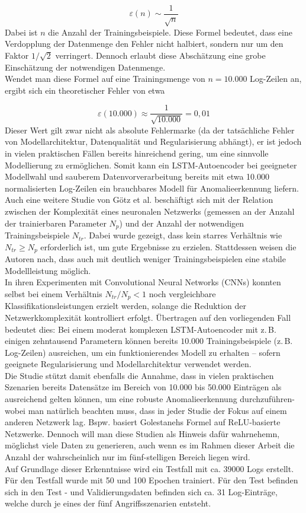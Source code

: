\documentclass[a4paper,12pt]{article}
\begin{document}
	\[
	\varepsilon(n) \sim \frac{1}{\sqrt{n}}
	\]
	Dabei ist \(n\) die Anzahl der Trainingsbeispiele. Diese Formel bedeutet, dass eine Verdopplung der Datenmenge den Fehler nicht halbiert, sondern nur um den Faktor \(1/\sqrt{2}\) verringert. Dennoch erlaubt diese Abschätzung eine grobe Einschätzung der notwendigen Datenmenge.
	\\[0.5em]
	Wendet man diese Formel auf eine Trainingsmenge von $n = 10.000$ Log-Zeilen an, ergibt sich ein theoretischer Fehler von etwa
	
	\[
	\varepsilon(10.000) \approx \frac{1}{\sqrt{10.000}} = 0{,}01
	\]
	Dieser Wert gilt zwar nicht als absolute Fehlermarke (da der tatsächliche Fehler von Modellarchitektur, Datenqualität und Regularisierung abhängt), er ist jedoch in vielen praktischen Fällen bereits hinreichend gering, um eine sinnvolle Modellierung zu ermöglichen. Somit kann ein LSTM-Autoencoder bei geeigneter Modellwahl und sauberem Datenvorverarbeitung bereits mit etwa 10.000 normalisierten Log-Zeilen ein brauchbares Modell für Anomalieerkennung liefern.
	\\[0.5em]
	Auch eine weitere Studie von Götz et al. \cite{Goetz2023} beschäftigt sich mit der Relation zwischen der Komplexität eines neuronalen Netzwerks (gemessen an der Anzahl der trainierbaren Parameter \( N_p \)) und der Anzahl der notwendigen Trainingsbeispiele \( N_{tr} \). Dabei wurde gezeigt, dass kein starres Verhältnis wie \( N_{tr} \geq N_p \) erforderlich ist, um gute Ergebnisse zu erzielen. Stattdessen weisen die Autoren nach, dass auch mit deutlich weniger Trainingsbeispielen eine stabile Modellleistung möglich.
	\\[0.5em]
	In ihren Experimenten mit Convolutional Neural Networks (CNNs) konnten selbst bei einem Verhältnis \( N_{tr}/N_p < 1 \) noch vergleichbare Klassifikationsleistungen erzielt werden, solange die Reduktion der Netzwerkkomplexität kontrolliert erfolgt. Übertragen auf den vorliegenden Fall bedeutet dies: Bei einem moderat komplexen LSTM-Autoencoder mit z.\,B. einigen zehntausend Parametern können bereits $10.000$ Trainingsbeispiele (z.\,B. Log-Zeilen) ausreichen, um ein funktionierendes Modell zu erhalten – sofern geeignete Regularisierung und Modellarchitektur verwendet werden. 
	\\[0.5em]
	Die Studie stützt damit ebenfalls die Annahme, dass in vielen praktischen Szenarien bereits Datensätze im Bereich von 10.000 bis 50.000 Einträgen als ausreichend gelten können, um eine robuste Anomalieerkennung durchzuführen-wobei man natürlich beachten muss, dass in jeder Studie der Fokus auf einem anderen Netzwerk lag. Bspw. basiert Golestanehs Formel auf ReLU-basierte Netzwerke. Dennoch will man diese Studien als Hinweis dafür wahrnehemn, möglichst viele Daten zu generieren, auch wenn es im Rahmen dieser Arbeit die Anzahl der wahrscheinlich nur im fünf-stelligen Bereich liegen wird.
	\\[0.5em]
	Auf Grundlage dieser Erkenntnisse wird ein Testfall mit ca. 39000 Logs erstellt.
	\\[0.5em]
	Für den Testfall wurde mit 50 und 100 Epochen trainiert. Für den Test befinden sich in den Test - und Validierungsdaten befinden sich ca. 31 Log-Einträge, welche durch je eines der fünf Angriffsszenarien entsteht.
\end{document}
